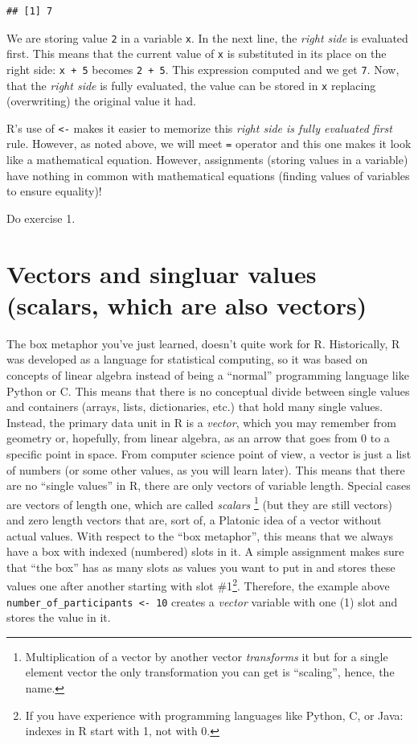 \documentclass[
]{book}
\begin{document}
\begin{verbatim}
## [1] 7
\end{verbatim}

We are storing value \texttt{2} in a variable \texttt{x}. In the next line, the \emph{right side} is evaluated first. This means that the current value of \texttt{x} is substituted in its place on the right side: \texttt{x\ +\ 5} becomes \texttt{2\ +\ 5}. This expression computed and we get \texttt{7}. Now, that the \emph{right side} is fully evaluated, the value can be stored in \texttt{x} replacing (overwriting) the original value it had.

R's use of \texttt{\textless{}-} makes it easier to memorize this \emph{right side is fully evaluated first} rule. However, as noted above, we will meet \texttt{=} operator and this one makes it look like a mathematical equation. However, assignments (storing values in a variable) have nothing in common with mathematical equations (finding values of variables to ensure equality)!

Do exercise 1.

\hypertarget{vectors-scalars}{%
\section{Vectors and singluar values (scalars, which are also vectors)}\label{vectors-scalars}}

The box metaphor you've just learned, doesn't quite work for R. Historically, R was developed as a language for statistical computing, so it was based on concepts of linear algebra instead of being a ``normal'' programming language like Python or C. This means that there is no conceptual divide between single values and containers (arrays, lists, dictionaries, etc.) that hold many single values. Instead, the primary data unit in R is a \emph{vector}, which you may remember from geometry or, hopefully, from linear algebra, as an arrow that goes from 0 to a specific point in space. From computer science point of view, a vector is just a list of numbers (or some other values, as you will learn later). This means that there are no ``single values'' in R, there are only vectors of variable length. Special cases are vectors of length one, which are called \emph{scalars} \footnote{Multiplication of a vector by another vector \emph{transforms} it but for a single element vector the only transformation you can get is ``scaling'', hence, the name.} (but they are still vectors) and zero length vectors that are, sort of, a Platonic idea of a vector without actual values. With respect to the ``box metaphor'', this means that we always have a box with indexed (numbered) slots in it. A simple assignment makes sure that ``the box'' has as many slots as values you want to put in and stores these values one after another starting with slot \#1\footnote{If you have experience with programming languages like Python, C, or Java: indexes in R start with 1, not with 0.}. Therefore, the example above \texttt{number\_of\_participants\ \textless{}-\ 10} creates a \emph{vector} variable with one (1) slot and stores the value in it.
\end{document}
